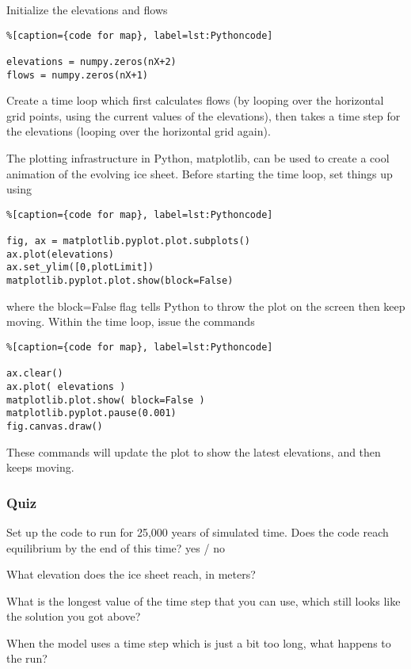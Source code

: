 {Initialize the elevations and flows


\begin{lstlisting}%[caption={code for map}, label=lst:Pythoncode]

elevations = numpy.zeros(nX+2)
flows = numpy.zeros(nX+1)
\end{lstlisting}

Create a time loop which first calculates flows (by looping over the horizontal grid points, using the current values of the elevations), then takes a time step for the elevations (looping over the horizontal grid again).

The plotting infrastructure in Python, matplotlib, can be used to create a cool animation of the evolving ice sheet. Before starting the time loop, set things up using


\begin{lstlisting}%[caption={code for map}, label=lst:Pythoncode]

fig, ax = matplotlib.pyplot.plot.subplots()
ax.plot(elevations)
ax.set_ylim([0,plotLimit])
matplotlib.pyplot.plot.show(block=False)
\end{lstlisting}

where the block=False flag tells Python to throw the plot on the screen then keep moving. Within the time loop, issue the commands

\begin{lstlisting}%[caption={code for map}, label=lst:Pythoncode]

ax.clear()
ax.plot( elevations )
matplotlib.plot.show( block=False )
matplotlib.pyplot.pause(0.001)
fig.canvas.draw()
\end{lstlisting}

These commands will update the plot to show the latest elevations, and then keeps moving.


\subsubsection{Quiz}\index{}
Set up the code to run for 25,000 years of simulated time. Does the code reach equilibrium by the end of this time?  
yes / no

What elevation does the ice sheet reach, in meters?


What is the longest value of the time step that you can use, which still looks like the solution you got above?


When the model uses a time step which is just a bit too long, what happens to the run?

}

